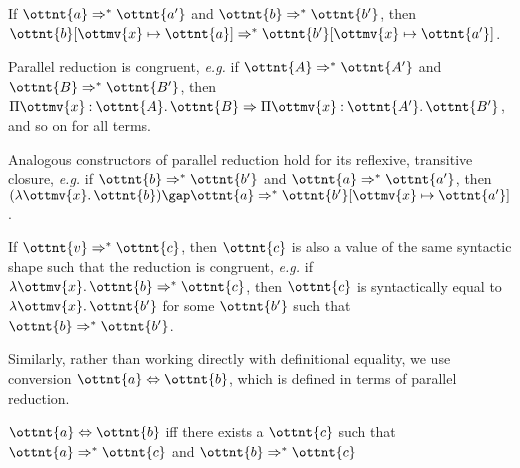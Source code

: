 \documentclass[a4paper,UKenglish,cleveref,autoref,thm-restate]{lipics-v2021}
\makeatletter
\newcommand{\eg}{\textit{e.g.}\@\xspace}
\makeatother
\begin{document}
\begin{lemma}[Substitution (p.r.)] \label{lem:pars:subst}
  If $ \ottnt{a}  \Rightarrow^\ast  \ottnt{a'} $ and $ \ottnt{b}  \Rightarrow^\ast  \ottnt{b'} $,
  then $  \ottnt{b} [  \ottmv{x}  \mapsto  \ottnt{a}  ]   \Rightarrow^\ast   \ottnt{b'} [  \ottmv{x}  \mapsto  \ottnt{a'}  ]  $.
\end{lemma}

\begin{lemma}[Congruence (p.r.)] \label{lem:pars:cong}
  Parallel reduction is congruent,
  \eg if $ \ottnt{A}  \Rightarrow^\ast  \ottnt{A'} $ and $ \ottnt{B}  \Rightarrow^\ast  \ottnt{B'} $,
  then $  \Pi  \ottmv{x}  \mathbin{:}  \ottnt{A}  \mathpunct{.}  \ottnt{B}   \Rightarrow   \Pi  \ottmv{x}  \mathbin{:}  \ottnt{A'}  \mathpunct{.}  \ottnt{B'}  $,
  and so on for all terms.
\end{lemma}

\begin{lemma}[Construction (p.r.)] \label{lem:pars:cons}
  Analogous constructors of parallel reduction hold
  for its reflexive, transitive closure,
  \eg if $ \ottnt{b}  \Rightarrow^\ast  \ottnt{b'} $ and $ \ottnt{a}  \Rightarrow^\ast  \ottnt{a'} $,
  then $   (  \lambda  \ottmv{x}  \mathpunct{.}  \ottnt{b}  )   \gap  \ottnt{a}   \Rightarrow^\ast   \ottnt{b'} [  \ottmv{x}  \mapsto  \ottnt{a'}  ]  $.
\end{lemma}

\begin{lemma}[Inversion (p.r.)] \label{lem:pars:inv}
  If $ \ottnt{v}  \Rightarrow^\ast  \ottnt{c} $, then $\ottnt{c}$ is also a value of the same syntactic shape
  such that the reduction is congruent,
  \eg if $  \lambda  \ottmv{x}  \mathpunct{.}  \ottnt{b}   \Rightarrow^\ast  \ottnt{c} $, then $\ottnt{c}$ is syntactically equal to $ \lambda  \ottmv{x}  \mathpunct{.}  \ottnt{b'} $
  for some $\ottnt{b'}$ such that $ \ottnt{b}  \Rightarrow^\ast  \ottnt{b'} $.
\end{lemma}

Similarly, rather than working directly with definitional equality,
we use conversion $ \ottnt{a}  \Leftrightarrow  \ottnt{b} $,
which is defined in terms of parallel reduction.

\begin{definition}[Conversion]
  $ \ottnt{a}  \Leftrightarrow  \ottnt{b} $ iff there exists a $\ottnt{c}$ such that
  $ \ottnt{a}  \Rightarrow^\ast  \ottnt{c} $ and $ \ottnt{b}  \Rightarrow^\ast  \ottnt{c} $
\end{definition}
\end{document}
